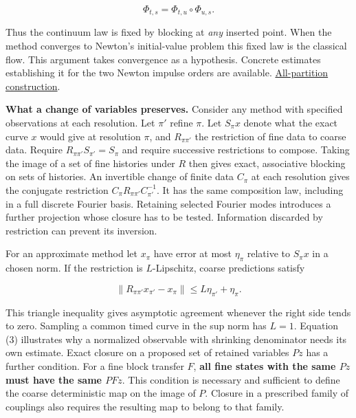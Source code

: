 \documentclass[11pt,a4paper]{article}
\begin{document}
\[
                  \Phi_{t,s}=\Phi_{t,u}\circ\Phi_{u,s}.
\]

Thus the continuum law is fixed by blocking at \emph{any} inserted
point. When the method converges to Newton's initial-value problem this
fixed law is the classical flow. This argument takes convergence as a
hypothesis. Concrete estimates establishing it for the two Newton
impulse orders are available.
\href{https://arivero.github.io/navstokgap/notes/refinement-composition-and-limit.html\#c.-all-refinement-sequences-and-two-microscopic-kick-orders}{All-partition
construction}.

\textbf{What a change of variables preserves.} Consider any method with
specified observations at each resolution. Let \(\pi'\) refine \(\pi\).
Let \(S_\pi x\) denote what the exact curve \(x\) would give at
resolution \(\pi\), and \(R_{\pi\pi'}\) the restriction of fine data to
coarse data. Require \(R_{\pi\pi'}S_{\pi'}=S_\pi\) and require
successive restrictions to compose. Taking the image of a set of fine
histories under \(R\) then gives exact, associative blocking on sets of
histories. An invertible change of finite data \(C_\pi\) at each
resolution gives the conjugate restriction
\(C_\pi R_{\pi\pi'}C_{\pi'}^{-1}\). It has the same composition law,
including in a full discrete Fourier basis. Retaining selected Fourier
modes introduces a further projection whose closure has to be tested.
Information discarded by restriction can prevent its inversion.

For an approximate method let \(x_\pi\) have error at most \(\eta_\pi\)
relative to \(S_\pi x\) in a chosen norm. If the restriction is
\(L\)-Lipschitz, coarse predictions satisfy

\[
 \|R_{\pi\pi'}x_{\pi'}-x_\pi\|
 \le L\eta_{\pi'}+\eta_\pi .                                       \tag{10}
\]

This triangle inequality gives asymptotic agreement whenever the right
side tends to zero. Sampling a common timed curve in the sup norm has
\(L=1\). Equation (3) illustrates why a normalized observable with
shrinking denominator needs its own estimate. Exact closure on a
proposed set of retained variables \(Pz\) has a further condition. For a
fine block transfer \(F\), \textbf{all fine states with the same \(Pz\)
must have the same \(PFz\)}. This condition is necessary and sufficient
to define the coarse deterministic map on the image of \(P\). Closure in
a prescribed family of couplings also requires the resulting map to
belong to that family.
\end{document}
